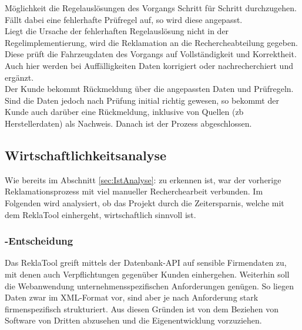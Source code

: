 Möglichkeit die Regelauslösungen des Vorgangs Schritt für Schritt durchzugehen. Fällt dabei eine fehlerhafte Prüfregel auf, so wird diese angepasst.\\
Liegt die Ursache der fehlerhaften Regelauslösung nicht in der Regelimplementierung, wird die Reklamation an die Rechercheabteilung 
gegeben. Diese prüft die Fahrzeugdaten des Vorgangs auf Vollständigkeit und Korrektheit. Auch hier werden bei Auffälligkeiten Daten 
korrigiert oder nachrecherchiert und ergänzt.\\
Der Kunde bekommt Rückmeldung über die angepassten Daten und Prüfregeln. 
Sind die Daten jedoch nach Prüfung initial richtig gewesen, so bekommt der Kunde auch darüber eine Rückmeldung, 
inklusive von Quellen (\acs{zb} Herstellerdaten) als Nachweis.
Danach ist der Prozess abgeschlossen.


\subsection{Wirtschaftlichkeitsanalyse}
\label{sec:Wirtschaftlichkeitsanalyse}
Wie bereits im Abschnitt \ref{sec:IstAnalyse}:  zu erkennen ist, war der vorherige Reklamationsprozess
mit viel manueller Recherchearbeit verbunden. Im Folgenden wird analysiert, ob das Projekt durch die Zeitersparnis,
welche mit dem ReklaTool einhergeht, wirtschaftlich sinnvoll ist. 


\subsubsection{-Entscheidung}
\label{sec:MakeOrBuyEntscheidung}
Das ReklaTool greift mittels der Datenbank-\acs{API} auf sensible Firmendaten zu, mit denen auch Verpflichtungen gegenüber
Kunden einhergehen. Weiterhin soll die Webanwendung unternehmensspezifischen Anforderungen genügen.
So liegen Daten zwar im \acs{XML}-Format vor, sind aber je nach Anforderung stark firmenspezifisch strukturiert.
Aus diesen Gründen ist von dem Beziehen von Software von Dritten abzusehen und die Eigenentwicklung vorzuziehen.



